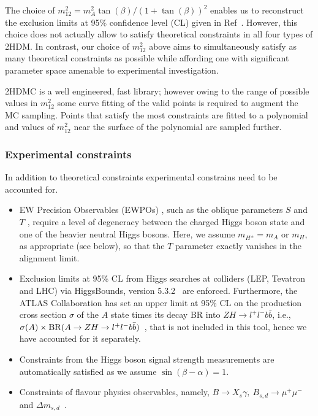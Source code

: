 The choice of \(m^2_{12} = m_A^2 \tan(\beta) / (1 + \tan(\beta))^2\) enables us to reconstruct the exclusion limits at 95\%  confidence level (CL) given in Ref~\cite{Aaboud2018AZHbbll}.
However, this choice does not actually allow to satisfy theoretical constraints in all four types of 2HDM.
In contrast, our choice of \(m_{12}^2\) above aims to simultaneously satisfy as many theoretical constraints as possible while affording one with significant parameter space amenable to experimental investigation.

2HDMC is a well engineered, fast library;
however owing to the range of possible values in \(m_{12}^2\) some curve fitting of the valid points
is required to augment the MC sampling.
Points that satisfy the most constraints are fitted to a polynomial and
values of \(m_{12}^2\) near the surface of the polynomial are sampled further.

\subsubsection{Experimental constraints}
In addition to theoretical constraints experimental constrains need to be accounted for.
\begin{itemize}
	\item EW Precision Observables (EWPOs) \cite{Haller2018EWUpdate}, such as the oblique parameters $S$ and $T$ \cite{Peskin:1991sw, Grimus2008Oblique}, require a level of degeneracy between the charged Higgs boson state and one of the heavier neutral Higgs bosons. Here, we assume $m_{H^\pm} = m_{A}$  or $m_H$, as appropriate (see below), so that the $T$ parameter exactly vanishes in the alignment limit. 
    \item Exclusion limits at 95\% CL from Higgs searches at colliders (LEP, Tevatron and LHC) via HiggsBounds, version 5.3.2~\cite{Bechtle2009higgsbounds, Bechtle2011higgsbounds2, Bechtle2014higgsbounds4} are enforced.
    Furthermore, the ATLAS Collaboration has set an upper limit at 95\% CL on the production cross section $\sigma$ of the $A$ state times its decay BR into $ZH\to l^+l^-b\bar b$, i.e., \(\sigma(A)\times {\rm BR}(A\rightarrow ZH \rightarrow l^+l^-b\bar b)\)~\cite{Aaboud2018AZHbbll}, that is not included in this tool, hence we have accounted for it separately.
	
\item Constraints from the Higgs boson signal strength measurements are automatically satisfied as we assume $\sin(\beta-\alpha) =1$.	
	
\item Constraints of {flavour physics observables,} namely, \(B \rightarrow X_s \gamma,~ B_{s,d} \rightarrow \mu^+\mu^-\) and \(\Delta m_{s,d}\)~\cite{Haller2018EWUpdate}.		
\end{itemize}

